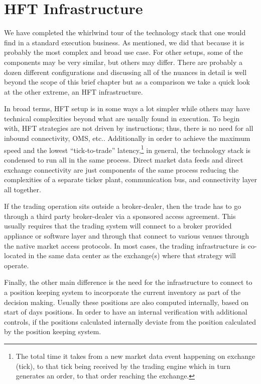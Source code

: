 \section{HFT Infrastructure}

We have completed the whirlwind tour of the technology stack that one would find in a standard execution business. As mentioned, we did  that because it is probably the most complex and broad use case. For other setups, some of the components may be very similar, but others may differ. There are probably a dozen different configurations and discussing all of the nuances in detail is well beyond the scope of this brief chapter but as a comparison we take a quick look at the other extreme, an HFT infrastructure.


In broad terms, HFT setup is in some ways a lot simpler while others may have technical complexities beyond what are usually found in execution. To begin with, HFT strategies are not driven by instructions; thus, there is no need for all inbound connectivity, OMS, etc..  Additionally in order to achieve the maximum speed and the lowest  ``tick-to-trade'' latency,\footnote{The total time it takes from a new market data event happening on exchange (tick), to that tick being received by the trading engine which in turn generates an order, to that order reaching the exchange.} in general, the technology stack is condensed to run all in the same process. Direct market data feeds and direct exchange connectivity are just components of the same process reducing the complexities of a separate ticker plant, communication bus, and connectivity layer all together. 


If the trading operation sits outside a broker-dealer, then the trade has to go through a third party broker-dealer via a sponsored access agreement. This usually requires that the trading system will connect to a broker provided appliance or software layer and through that connect to various venues through the native market access protocols. In most cases, the trading infrastructure is co-located in the same data center as the exchange(s) where that strategy will operate.


Finally, the other main difference is the need for the infrastructure to connect to a position keeping system to incorporate the current inventory as part of the decision making. Usually these positions are also computed internally, based on start of days positions. In order to have an internal verification with additional controls, if the positions calculated internally deviate from the position calculated by the position keeping system.


